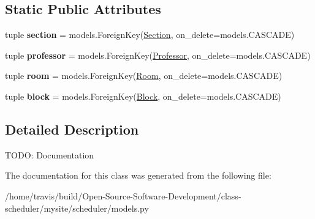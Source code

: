 \subsection*{Static Public Attributes}
\begin{DoxyCompactItemize}
\item 
\hypertarget{classscheduler_1_1models_1_1_hunk_a24e5838d535817f4d0cb27f8fb6edd36}{tuple {\bfseries section} = models.\-Foreign\-Key(\hyperlink{classscheduler_1_1models_1_1_section}{Section}, on\-\_\-delete=models.\-C\-A\-S\-C\-A\-D\-E)}\label{classscheduler_1_1models_1_1_hunk_a24e5838d535817f4d0cb27f8fb6edd36}

\item 
\hypertarget{classscheduler_1_1models_1_1_hunk_aa01e29b62d649ce7cd0ccc0e35b51747}{tuple {\bfseries professor} = models.\-Foreign\-Key(\hyperlink{classscheduler_1_1models_1_1_professor}{Professor}, on\-\_\-delete=models.\-C\-A\-S\-C\-A\-D\-E)}\label{classscheduler_1_1models_1_1_hunk_aa01e29b62d649ce7cd0ccc0e35b51747}

\item 
\hypertarget{classscheduler_1_1models_1_1_hunk_ac50c8aaab3e58e9bf1ff953f4246f21a}{tuple {\bfseries room} = models.\-Foreign\-Key(\hyperlink{classscheduler_1_1models_1_1_room}{Room}, on\-\_\-delete=models.\-C\-A\-S\-C\-A\-D\-E)}\label{classscheduler_1_1models_1_1_hunk_ac50c8aaab3e58e9bf1ff953f4246f21a}

\item 
\hypertarget{classscheduler_1_1models_1_1_hunk_ab6e2df449de158fcf00218f6f2e63832}{tuple {\bfseries block} = models.\-Foreign\-Key(\hyperlink{classscheduler_1_1models_1_1_block}{Block}, on\-\_\-delete=models.\-C\-A\-S\-C\-A\-D\-E)}\label{classscheduler_1_1models_1_1_hunk_ab6e2df449de158fcf00218f6f2e63832}

\end{DoxyCompactItemize}


\subsection{Detailed Description}
\begin{DoxyVerb}    TODO:
        Documentation
\end{DoxyVerb}
 

The documentation for this class was generated from the following file\-:\begin{DoxyCompactItemize}
\item 
/home/travis/build/\-Open-\/\-Source-\/\-Software-\/\-Development/class-\/scheduler/mysite/scheduler/models.\-py\end{DoxyCompactItemize}
